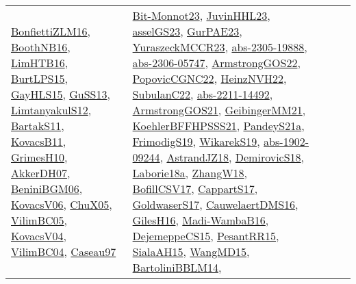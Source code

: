 {\begin{longtable}{llp{6cm}p{6cm}p{6cm}}
\href{papers/BonfiettiZLM16.pdf}{BonfiettiZLM16}\cite{BonfiettiZLM16}, \href{papers/BoothNB16.pdf}{BoothNB16}\cite{BoothNB16}, \href{papers/LimHTB16.pdf}{LimHTB16}\cite{LimHTB16}, \href{papers/BurtLPS15.pdf}{BurtLPS15}\cite{BurtLPS15}, \href{papers/GayHLS15.pdf}{GayHLS15}\cite{GayHLS15}, \href{papers/GuSS13.pdf}{GuSS13}\cite{GuSS13}, \href{articles/LimtanyakulS12.pdf}{LimtanyakulS12}\cite{LimtanyakulS12}, \href{articles/BartakS11.pdf}{BartakS11}\cite{BartakS11}, \href{articles/KovacsB11.pdf}{KovacsB11}\cite{KovacsB11}, \href{papers/GrimesH10.pdf}{GrimesH10}\cite{GrimesH10}, \href{papers/AkkerDH07.pdf}{AkkerDH07}\cite{AkkerDH07}, \href{papers/BeniniBGM06.pdf}{BeniniBGM06}\cite{BeniniBGM06}, \href{papers/KovacsV06.pdf}{KovacsV06}\cite{KovacsV06}, \href{papers/ChuX05.pdf}{ChuX05}\cite{ChuX05}, \href{articles/VilimBC05.pdf}{VilimBC05}\cite{VilimBC05}, \href{papers/KovacsV04.pdf}{KovacsV04}\cite{KovacsV04}, \href{papers/VilimBC04.pdf}{VilimBC04}\cite{VilimBC04}, \href{papers/Caseau97.pdf}{Caseau97}\cite{Caseau97} & \href{papers/Bit-Monnot23.pdf}{Bit-Monnot23}\cite{Bit-Monnot23}, \href{papers/JuvinHHL23.pdf}{JuvinHHL23}\cite{JuvinHHL23}, \href{papers/asselGS23.pdf}{asselGS23}\cite{asselGS23}, \href{articles/GurPAE23.pdf}{GurPAE23}\cite{GurPAE23}, \href{articles/YuraszeckMCCR23.pdf}{YuraszeckMCCR23}\cite{YuraszeckMCCR23}, \href{articles/abs-2305-19888.pdf}{abs-2305-19888}\cite{abs-2305-19888}, \href{articles/abs-2306-05747.pdf}{abs-2306-05747}\cite{abs-2306-05747}, \href{papers/ArmstrongGOS22.pdf}{ArmstrongGOS22}\cite{ArmstrongGOS22}, \href{papers/PopovicCGNC22.pdf}{PopovicCGNC22}\cite{PopovicCGNC22}, \href{articles/HeinzNVH22.pdf}{HeinzNVH22}\cite{HeinzNVH22}, \href{articles/SubulanC22.pdf}{SubulanC22}\cite{SubulanC22}, \href{articles/abs-2211-14492.pdf}{abs-2211-14492}\cite{abs-2211-14492}, \href{papers/ArmstrongGOS21.pdf}{ArmstrongGOS21}\cite{ArmstrongGOS21}, \href{papers/GeibingerMM21.pdf}{GeibingerMM21}\cite{GeibingerMM21}, \href{articles/KoehlerBFFHPSSS21.pdf}{KoehlerBFFHPSSS21}\cite{KoehlerBFFHPSSS21}, \href{articles/PandeyS21a.pdf}{PandeyS21a}\cite{PandeyS21a}, \href{papers/FrimodigS19.pdf}{FrimodigS19}\cite{FrimodigS19}, \href{articles/WikarekS19.pdf}{WikarekS19}\cite{WikarekS19}, \href{articles/abs-1902-09244.pdf}{abs-1902-09244}\cite{abs-1902-09244}, \href{papers/AstrandJZ18.pdf}{AstrandJZ18}\cite{AstrandJZ18}, \href{papers/DemirovicS18.pdf}{DemirovicS18}\cite{DemirovicS18}, \href{papers/Laborie18a.pdf}{Laborie18a}\cite{Laborie18a}, \href{articles/ZhangW18.pdf}{ZhangW18}\cite{ZhangW18}, \href{papers/BofillCSV17.pdf}{BofillCSV17}\cite{BofillCSV17}, \href{papers/CappartS17.pdf}{CappartS17}\cite{CappartS17}, \href{papers/GoldwaserS17.pdf}{GoldwaserS17}\cite{GoldwaserS17}, \href{papers/CauwelaertDMS16.pdf}{CauwelaertDMS16}\cite{CauwelaertDMS16}, \href{papers/GilesH16.pdf}{GilesH16}\cite{GilesH16}, \href{papers/Madi-WambaB16.pdf}{Madi-WambaB16}\cite{Madi-WambaB16}, \href{papers/DejemeppeCS15.pdf}{DejemeppeCS15}\cite{DejemeppeCS15}, \href{papers/PesantRR15.pdf}{PesantRR15}\cite{PesantRR15}, \href{papers/SialaAH15.pdf}{SialaAH15}\cite{SialaAH15}, \href{articles/WangMD15.pdf}{WangMD15}\cite{WangMD15}, \href{papers/BartoliniBBLM14.pdf}{BartoliniBBLM14}\cite{BartoliniBBLM14}, 
\end{longtable}}
